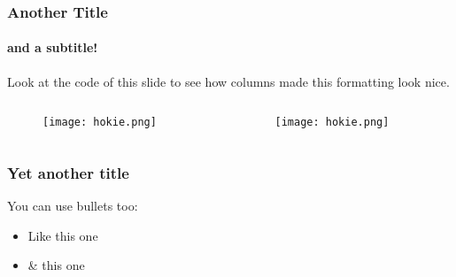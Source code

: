 \begin{frame}
    \frametitle{Another Title}
    \framesubtitle{and a subtitle!}

    Look at the code of this slide to see how columns made this formatting look nice.

    \begin{columns}[t] %
        \begin{column}{0.5\textwidth} %
            \begin{figure}[h!]
                \centering
                \texttt{[image: hokie.png]}
            \end{figure}
        \end{column}
        \begin{column}{0.5\textwidth} %
            \begin{figure}[h!]
                \centering
                \texttt{[image: hokie.png]}
            \end{figure}
        \end{column}
    \end{columns}
\end{frame}

\begin{frame}
    \frametitle{Yet another title}
    You can use bullets too: \newline
    \begin{itemize}
        \item Like this one \newline
        \item \& this one
    \end{itemize}
\end{frame}

